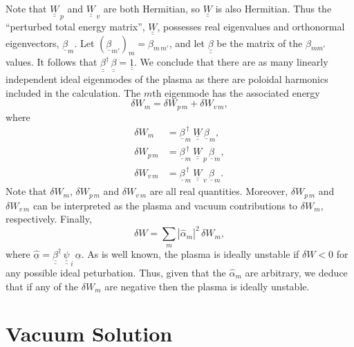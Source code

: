 \documentclass[12pt,prb,aps]{revtex4-1}
\begin{document}
Note that $\underline{\underline{W}}_{\,p}$ and $\underline{\underline{W}}_{\,v}$ are both Hermitian, so $\underline{\underline{W}}$ is also
Hermitian. Thus the ``perturbed total energy matrix'', $\underline{\underline{W}}$, possesses real eigenvalues and orthonormal eigenvectors, $\underline{\beta}_m$. Let $(\underline{\beta}_{m'})_{m} = \beta_{m\,m'}$, and let $\underline{\underline{\beta}}$ be the matrix of the $\beta_{mm'}$ values. It follows that  
$\underline{\underline{\beta}}^\dag\,\underline{\underline{\beta}}= \underline{\underline{1}}$. 
We conclude that there are as many linearly independent ideal eigenmodes of the plasma as there are poloidal harmonics included in the calculation. The $m$th
eigenmode has the associated energy
\begin{equation}
\delta W_m = \delta W_{p\,m} + \delta W_{v\,m},
\end{equation}
where 
\begin{align}
\delta W_m &= \underline{\beta}_m^{\,\dag}\,\underline{\underline{W}}\, \underline{\beta}_m,\\[0.5ex]
\delta W_{p\,m} &= \underline{\beta}_m^{\,\dag}\,\underline{\underline{W}}_{\,p}\, \underline{\beta}_m,\\[0.5ex]
\delta W_{v\,m} &= \underline{\beta}_m^{\,\dag}\,\underline{\underline{W}}_{\,v}\, \underline{\beta}_m.
\end{align}
Note that $\delta W_m$, $\delta W_{p\,m}$ and $\delta W_{v\,m}$ are all real quantities. Moreover, $\delta W_{p\,m}$ and $\delta W_{v\,m}$ can be interpreted as the
plasma and vacuum contributions to $\delta W_m$, respectively. Finally, 
\begin{equation}
\delta W = \sum_m |\hat{\alpha}_m|^2\,\delta W_m,
\end{equation}
where $\underline{\hat{\alpha}}= \underline{\underline{\beta}}^\dag\,\underline{\underline{\psi}}_{\,i}\,\underline{\alpha}$. 
As is well known, the plasma is ideally unstable if $\delta W<0$ for any possible ideal peturbation.\cite{freidberg,ideal}
Thus, given that the $\hat{\alpha}_m$ are arbitrary, we deduce that if any of the $\delta W_m$ are negative then the plasma is ideally unstable.

\section{Vacuum Solution}\label{vacuum}
\end{document}
